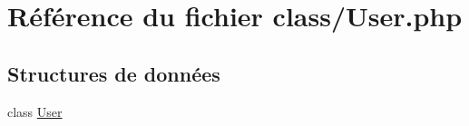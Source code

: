 \hypertarget{_user_8php}{}\section{Référence du fichier class/\+User.php}
\label{_user_8php}
\subsection*{Structures de données}
\begin{DoxyCompactItemize}
\item 
class \mbox{\hyperlink{class_user}{User}}
\end{DoxyCompactItemize}
